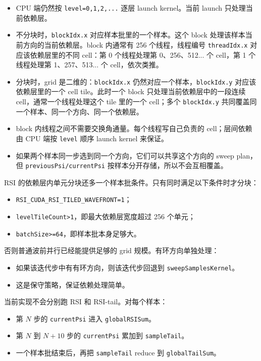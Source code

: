 \documentclass[10pt]{article}
\newcommand{\subsect}[1]{\vspace{2mm}{\sffamily\large\bfseries #1}\par}
\newcommand{\code}[1]{\texttt{#1}}
\begin{document}
\begin{itemize}
\item CPU 端仍然按 \code{level=0,1,2,...} 逐层 launch kernel。当前 launch 只处理当前依赖层。
\item 不分块时，\code{blockIdx.x} 对应样本批里的一个样本。这个 block 处理该样本当前方向的当前依赖层。block 内通常有 256 个线程，线程编号 \code{threadIdx.x} 对应该依赖层里的不同 cell：第 0 个线程处理第 0、256、512... 个 cell，第 1 个线程处理第 1、257、513... 个 cell，依次类推。
\item 分块时，grid 是二维的：\code{blockIdx.x} 仍然对应一个样本，\code{blockIdx.y} 对应该依赖层里的一个 cell tile。此时一个 block 只处理当前依赖层中的一段连续 cell，通常一个线程处理这个 tile 里的一个 cell；多个 \code{blockIdx.y} 共同覆盖同一个样本、同一个方向、同一个依赖层。
\item block 内线程之间不需要交换角通量。每个线程写自己负责的 cell；层间依赖由 CPU 端按 \code{level} 顺序 launch kernel 来保证。
\item 如果两个样本同一步选到同一个方向，它们可以共享这个方向的 sweep plan，但 \code{previousPsi/currentPsi} 按样本分开存储，所以不会互相覆盖。
\end{itemize}

RSI 的依赖层内单元分块还多一个样本批条件。只有同时满足以下条件时才分块：
\begin{itemize}
\item \code{RSI\_CUDA\_RSI\_TILED\_WAVEFRONT=1}；
\item \code{levelTileCount>1}，即最大依赖层宽度超过 256 个单元；
\item \code{batchSize>=64}，即样本批本身足够大。
\end{itemize}
否则普通波前并行已经能提供足够的 grid 规模。有环方向单独处理：
\begin{itemize}
\item 如果该迭代步中有有环方向，则该迭代步回退到 \code{sweepSamplesKernel}。
\item 这是保守策略，保证依赖处理简单。
\end{itemize}

\subsect{4.4 RSI 与 RSI-tail 合并计算}

当前实现不会分别跑 RSI 和 RSI-tail。对每个样本：

\begin{itemize}
\item 第 $N$ 步的 \code{currentPsi} 进入 \code{globalRSISum}。
\item 第 $N$ 到 $N+10$ 步的 \code{currentPsi} 累加到 \code{sampleTail}。
\item 一个样本批结束后，再把 \code{sampleTail} reduce 到 \code{globalTailSum}。
\end{itemize}
\end{document}
